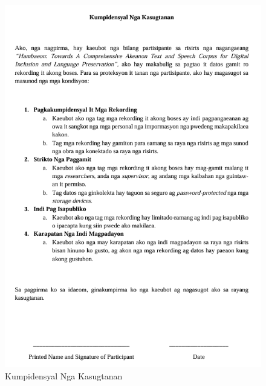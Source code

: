 \begin{figure}[h!]
	\centering
	\includegraphics[width=\textwidth]{./appendix/Kumpidensyal_Nga_Kasugtanan.png}
	\caption{Kumpidensyal Nga Kasugtanan}
	\label{fig:KumpidensyalNgaKasugtanan}
\end{figure}

